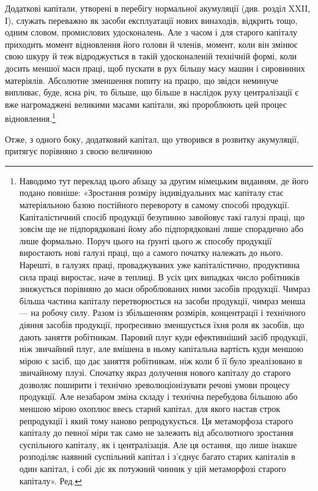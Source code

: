 Додаткові капітали, утворені в перебігу нормальної акумуляції
(див. розділ XXII, І), служать переважно як засоби
експлуатації нових винаходів, відкрить тощо, одним словом,
промислових удосконалень. Але з часом і для старого капіталу
приходить момент відновлення його голови й членів, момент,
коли він змінює свою шкуру й теж відроджується в такій удосконаленій
технічній формі, коли досить меншої маси праці,
щоб пускати в рух більшу масу машин і сировинних матеріялів.
Абсолютне зменшення попиту на працю, що звідси неминуче
випливає, буде, ясна річ, то більше, що більше в наслідок руху
централізації є вже нагромаджені великими масами капітали,
які пророблюють цей процес відновлення.\footnote*{
Наводимо тут переклад цього абзацу за другим німецьким виданням,
де його подано повніше: «Зростання розміру індивідуальних мас
капіталу стає матеріяльною базою постійного перевороту в самому способі
продукції. Капіталістичний спосіб продукції безупинно завойовує
такі галузі праці, що зовсім ще не підпорядковані йому або підпорядковані
лише спорадично або лише формально. Поруч цього на ґрунті
цього ж способу продукції виростають нові галузі праці, що а самого початку
належать до нього. Нарешті, в галузях праці, проваджуваних
уже капіталістично, продуктивна сила праці виростає, наче в теплиці.
В усіх цих випадках число робітників знижується порівняно до маси
оброблюваних ними засобів продукції. Чимраз більша частина капіталу
перетворюється на засоби продукції, чимраз менша — на робочу силу.
Разом із збільшенням розмірів, концентрації і технічного діяння
засобів продукції, проґресивно зменшується їхня роля як засобів, що
дають заняття робітникам. Паровий плуг куди ефективніший засіб продукції,
ніж звичайний плуг, але вмішена в ньому капітальна вартість
куди меншою мірою є засіб, що дає заняття робітникам, ніж коли б її
було зреалізовано в звичайному плузі. Спочатку якраз долучення нового
капіталу до старого дозволяє поширити і технічно зреволюціонізувати
речові умови процесу продукції. Але незабаром зміна складу і технічна
перебудова більшою або меншою мірою охоплює ввесь старий капітал,
для якого настав строк репродукції і який тому наново репродукується.
Ця метаморфоза старого капіталу до певної міри так само не залежить від
абсолютного зростання суспільного капіталу, як і централізація. Але ця
остання, що лише інакше розподіляє наявний суспільний капітал і з’єднує
багато старих капіталів в один капітал, і собі діє як потужний чинник
у цій метаморфозі старого капіталу». Ред.
}

Отже, з одного боку, додатковий капітал, що утворився в
розвитку акумуляції, притягує порівняно з своєю величиною
\parbreak{}  %
